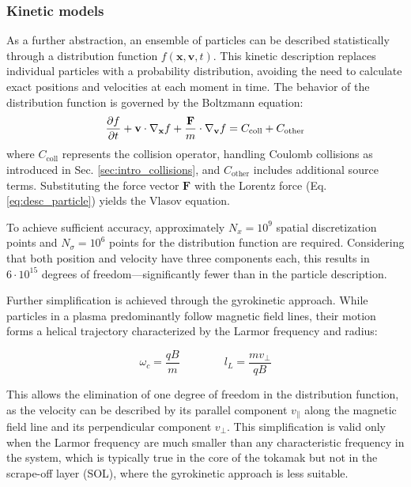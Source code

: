 \subsubsection{Kinetic models}
\label{ssec:desc_kineticModels}
As a further abstraction, an ensemble of particles can be described statistically through a distribution function $f(\mathbf{x}, \mathbf{v},t)$. This kinetic description replaces individual particles with a probability distribution, avoiding the need to calculate exact positions and velocities at each moment in time. The behavior of the distribution function is governed by the Boltzmann equation:
\begin{equation}
	\label{eq:BoltzmannEquationKineticDescription}
	\pdv{f}{t} + \mathbf{v} \cdot \nabla_{\mathbf{x}} f + \frac{\mathbf{F}}{m} \cdot \nabla_{\mathbf{v}} f = C_{\text{coll}} + C_{\text{other}}
\end{equation}
where $C_{\text{coll}}$ represents the collision operator, handling Coulomb collisions as introduced in Sec. \ref{sec:intro_collisions}, and $C_{\text{other}}$ includes additional source terms. Substituting the force vector $\mathbf{F}$ with the Lorentz force (Eq. \ref{eq:desc_particle}) yields the Vlasov equation. \newline

To achieve sufficient accuracy, approximately $N_x = 10^9$ spatial discretization points and $N_\sigma = 10^6$ points for the distribution function are required. Considering that both position and velocity have three components each, this results in $6 \cdot 10^{15}$ degrees of freedom—significantly fewer than in the particle description. \newline

Further simplification is achieved through the gyrokinetic approach. While particles in a plasma predominantly follow magnetic field lines, their motion forms a helical trajectory characterized by the Larmor frequency and radius:

\begin{equation}
	\omega_c = \frac{qB}{m} \qquad\qquad l_L = \frac{mv_\perp}{qB}
\end{equation}

This allows the elimination of one degree of freedom in the distribution function, as the velocity can be described by its parallel component $v_\parallel$ along the magnetic field line and its perpendicular component $v_\perp$. This simplification is valid only when the Larmor frequency are much smaller than any characteristic frequency in the system, which is typically true in the core of the tokamak but not in the scrape-off layer (SOL), where the gyrokinetic approach is less suitable. \\

